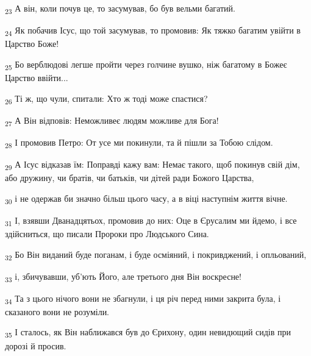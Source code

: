 \begin{tcolorbox}
\textsubscript{23} А він, коли почув це, то засумував, бо був вельми багатий.
\end{tcolorbox}
\begin{tcolorbox}
\textsubscript{24} Як побачив Ісус, що той засумував, то промовив: Як тяжко багатим увійти в Царство Боже!
\end{tcolorbox}
\begin{tcolorbox}
\textsubscript{25} Бо верблюдові легше пройти через голчине вушко, ніж багатому в Божеє Царство ввійти...
\end{tcolorbox}
\begin{tcolorbox}
\textsubscript{26} Ті ж, що чули, спитали: Хто ж тоді може спастися?
\end{tcolorbox}
\begin{tcolorbox}
\textsubscript{27} А Він відповів: Неможливеє людям можливе для Бога!
\end{tcolorbox}
\begin{tcolorbox}
\textsubscript{28} І промовив Петро: От усе ми покинули, та й пішли за Тобою слідом.
\end{tcolorbox}
\begin{tcolorbox}
\textsubscript{29} А Ісус відказав їм: Поправді кажу вам: Немає такого, щоб покинув свій дім, або дружину, чи братів, чи батьків, чи дітей ради Божого Царства,
\end{tcolorbox}
\begin{tcolorbox}
\textsubscript{30} і не одержав би значно більш цього часу, а в віці наступнім життя вічне.
\end{tcolorbox}
\begin{tcolorbox}
\textsubscript{31} І, взявши Дванадцятьох, промовив до них: Оце в Єрусалим ми йдемо, і все здійсниться, що писали Пророки про Людського Сина.
\end{tcolorbox}
\begin{tcolorbox}
\textsubscript{32} Бо Він виданий буде поганам, і буде осміяний, і покривджений, і опльований,
\end{tcolorbox}
\begin{tcolorbox}
\textsubscript{33} і, збичувавши, уб'ють Його, але третього дня Він воскресне!
\end{tcolorbox}
\begin{tcolorbox}
\textsubscript{34} Та з цього нічого вони не збагнули, і ця річ перед ними закрита була, і сказаного вони не розуміли.
\end{tcolorbox}
\begin{tcolorbox}
\textsubscript{35} І сталось, як Він наближався був до Єрихону, один невидющий сидів при дорозі й просив.
\end{tcolorbox}
